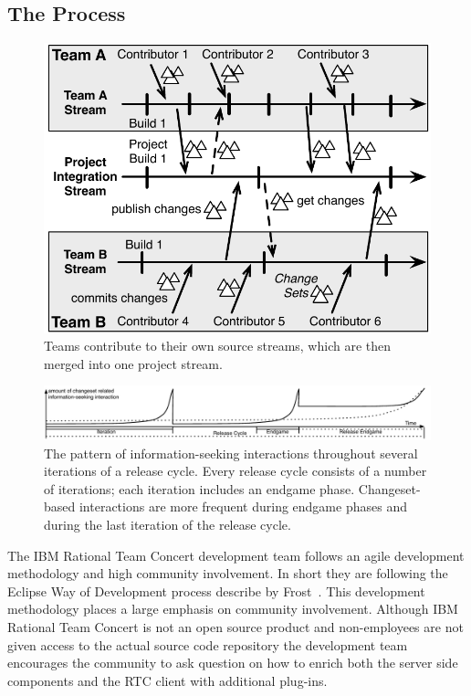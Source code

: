 \subsection{The Process}
\begin{figure}[t]
\begin{center}
\includegraphics[width=.9\columnwidth]{figures/BuildResult}
\caption{Teams contribute to their own source streams, which are then merged into one project stream.}
\label{fig:buildresult1}
\end{center}
\end{figure}

\begin{figure}[t]
\centering
\includegraphics[width=\textwidth]{figures/findingProcess2}
\vspace{-20pt}\caption{The pattern of information-seeking interactions throughout several iterations of a release cycle. Every release cycle consists of a number of iterations; each iteration includes an endgame phase. Changeset-based interactions are more frequent during endgame phases and during the last iteration of the release cycle.}
\label{IterationsFig1}
\end{figure}

The IBM Rational Team Concert development team follows an agile development methodology and high community involvement.
In short they are following the Eclipse Way of Development process describe by Frost~\cite{frost:ieeesoftware:2007}.
This development methodology places a large emphasis on community involvement.
Although IBM Rational Team Concert is not an open source product and non-employees are not given access to the actual source code repository the development team encourages the community to ask question on how to enrich both the server side components and the RTC client with additional plug-ins.

